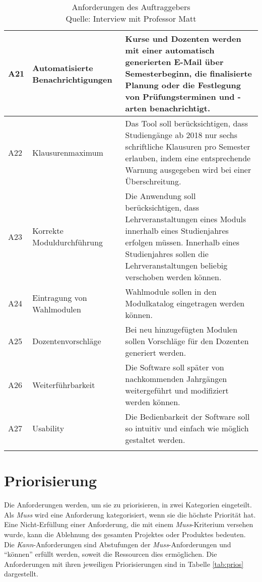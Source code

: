 \begin{longtable}[h]{|p{}|p{4cm}|p{}|}
	\parbox[t]{3cm}{A21} & Automatisierte Benachrichtigungen & Kurse und Dozenten werden mit einer automatisch generierten E-Mail über Semesterbeginn, die finalisierte Planung  oder die Festlegung von Prüfungsterminen und -arten benachrichtigt.\\ \hline
	\parbox[t]{3cm}{A22} & Klausurenmaximum & Das Tool soll berücksichtigen, dass Studiengänge ab 2018  nur sechs schriftliche Klausuren pro Semester erlauben, indem eine entsprechende Warnung ausgegeben wird bei einer Überschreitung.\\ \hline
	\parbox[t]{3cm}{A23} & Korrekte Moduldurchführung  & Die Anwendung soll berücksichtigen, dass Lehrveranstaltungen eines Moduls innerhalb eines Studienjahres erfolgen müssen. Innerhalb eines Studienjahres sollen die Lehrveranstaltungen beliebig verschoben werden können.\\ \hline
	\parbox[t]{3cm}{A24} & Eintragung von Wahlmodulen & Wahlmodule sollen in den Modulkatalog eingetragen werden können.\\ \hline
	\parbox[t]{3cm}{A25} & Dozentenvorschläge & Bei neu hinzugefügten Modulen sollen Vorschläge für den Dozenten generiert werden.\\ \hline
	\parbox[t]{3cm}{A26} & Weiterführbarkeit & Die Software soll später von nachkommenden Jahrgängen weitergeführt und modifiziert werden können.\\ \hline
	\parbox[t]{3cm}{A27} & Usability & Die Bedienbarkeit der Software soll so intuitiv und einfach wie möglich gestaltet werden.\\ \hline
	
	\captionsetup{format=hang}
	\caption[Anforderungen des Auftraggebers]{\label{tab:Anforderungen}Anforderungen des Auftraggebers\\Quelle: Interview mit Professor Matt}
\end{longtable}


\section{Priorisierung}

Die Anforderungen werden, um sie zu priorisieren, in zwei
Kategorien eingeteilt. Als \textit{Muss} wird eine Anforderung kategorisiert, wenn sie die höchste Priorität hat. Eine Nicht-Erfüllung einer Anforderung, die mit einem \textit{Muss}-Kriterium versehen wurde, kann die Ablehnung des gesamten Projektes oder Produktes bedeuten. Die \textit{Kann}-Anforderungen sind Abstufungen der \textit{Muss}-Anforderungen und
\enquote{können} erfüllt werden, soweit die Ressourcen dies ermöglichen. Die Anforderungen mit ihren jeweiligen Priorisierungen sind in Tabelle \vref{tab:prios}  dargestellt. 


